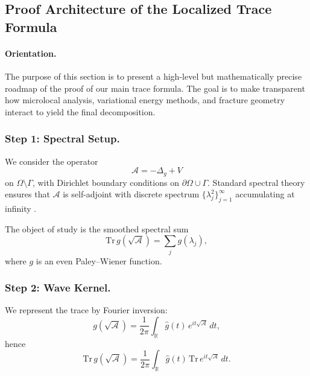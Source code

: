 
\subsection{Proof Architecture of the Localized Trace Formula}

\paragraph{Orientation.}
The purpose of this section is to present a high-level but
mathematically precise roadmap of the proof of our main trace
formula. The goal is to make transparent how microlocal analysis,
variational energy methods, and fracture geometry interact to yield
the final decomposition.


\subsubsection{Step 1: Spectral Setup.}
We consider the operator
\[
\mathcal{A} = -\Delta_g + V
\]
on $\Omega \setminus \Gamma$, with Dirichlet boundary conditions on
$\partial\Omega \cup \Gamma$. Standard spectral theory ensures that
$\mathcal{A}$ is self-adjoint with discrete spectrum
$\{\lambda_j^2\}_{j=1}^\infty$ accumulating at infinity
\cite{ReedSimon1978}.

The object of study is the smoothed spectral sum
\[
\mathrm{Tr}\,g(\sqrt{\mathcal{A}}) = \sum_{j} g(\lambda_j),
\]
where $g$ is an even Paley–Wiener function.


\subsubsection{Step 2: Wave Kernel.}
We represent the trace by Fourier inversion:
\[
g(\sqrt{\mathcal{A}}) = \frac{1}{2\pi}\int_\mathbb{R}
\widehat{g}(t)\,e^{it\sqrt{\mathcal{A}}}\,dt,
\]
hence
\[
\mathrm{Tr}\,g(\sqrt{\mathcal{A}}) =
\frac{1}{2\pi}\int_\mathbb{R}\widehat{g}(t)\,
\mathrm{Tr}\,e^{it\sqrt{\mathcal{A}}}\,dt.
\]

